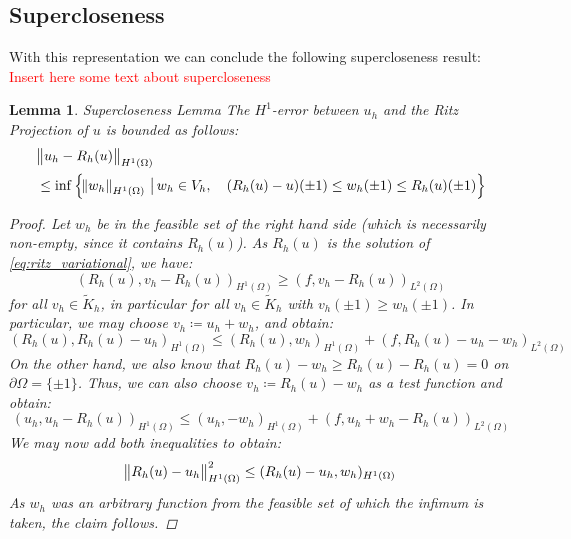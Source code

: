 \documentclass[headsepline,footsepline,footinclude=false,oneside,fontsize=11pt,paper=a4,listof=totoc,bibliography=totoc]{scrbook} %
\newtheorem{lemma}{Lemma}
\begin{document}
\subsection{Supercloseness}

With this representation we can conclude the following supercloseness result: \textcolor{red}{Insert here some text about supercloseness}

\begin{lemma} Supercloseness Lemma \newline
	The $H^1$-error between $u_h$ and the Ritz Projection of $u$ is bounded as follows:
	\begin{align} \label{eq:supercloseness_lemma}
	\begin{split}
	&\norm{u_h - R_h(u)}_{H^1(\Omega)} \\ &\leq \inf \left\{
	\norm{w_h}_{H^1(\Omega)} \,\big|\, w_h \in V_h, \quad (R_h(u) - u)(\pm 1) \leq w_h(\pm 1) \leq R_h(u)(\pm 1)
	\right\}
	\end{split}
	\end{align}
	\begin{proof}
		Let $w_h$ be in the feasible set of the right hand side (which is necessarily non-empty, since it contains $R_h(u)$). As $R_h(u)$ is the solution of \eqref{eq:ritz_variational}, we have:
		\begin{equation*}
		(R_h(u), v_h - R_h(u))_{H^1(\Omega)} \geq (f, v_h - R_h(u))_{L^2(\Omega)}
		\end{equation*}
		for all $v_h \in \tilde{K}_h$, in particular for all $v_h \in \tilde{K}_h$ with $v_h(\pm 1) \geq w_h(\pm 1)$. In particular, we may choose $v_h \coloneqq u_h + w_h$, and obtain:
		\begin{equation*}
		(R_h(u), R_h(u)-u_h)_{H^1(\Omega)} \leq (R_h(u),w_h)_{H^1(\Omega)} + (f,R_h(u)-u_h-w_h)_{L^2(\Omega)}
		\end{equation*}
		On the other hand, we also know that $R_h(u)-w_h \geq R_h(u) - R_h(u) = 0$ on $\partial\Omega = \{\pm 1\}$. Thus, we can also choose $v_h \coloneqq R_h(u) - w_h$ as a test function and obtain:
		\begin{equation*}
		(u_h, u_h-R_h(u))_{H^1(\Omega)} \leq (u_h,-w_h)_{H^1(\Omega)} + (f,u_h + w_h - R_h(u))_{L^2(\Omega)}
		\end{equation*}		
		We may now add both inequalities to obtain:
		\begin{equation*}
		\norm{R_h(u)-u_h}^2_{H^1(\Omega)} \leq (R_h(u)-u_h, w_h)_{H^1(\Omega)}
		\end{equation*}
		As $w_h$ was an arbitrary function from the feasible set of which the infimum is taken, the claim follows.
	\end{proof}
\end{lemma}
\end{document}
